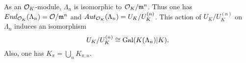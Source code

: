 \begin{theorem}
  As an $\mathcal{O}_{K}$-module, $\Lambda_{n}$ is isomorphic to $\mathcal{O}_{K}/\mathfrak{m}^{n}$.
  Thus one has $End_{\mathcal{O}_{K}}(\Lambda_{n}) = \mathcal{O}/\mathfrak{m}^{n}$ and $Aut_{\mathcal{O}_{K}}(\Lambda_{n}) = U_{K}/U_{K}^{(n)}$.
  This action of $U_{K}/U_{K}^{(n)}$ on $\Lambda_{n}$ induces an isomorphism
  \[ U_{K}/U_{K}^{(n)} \cong \operatorname{Gal}(K(\Lambda_{n})|K). \]
  Also, one has $K_{\pi} = \bigcup_{n} K_{\pi,n}$.
\end{theorem}


